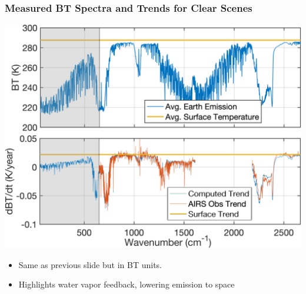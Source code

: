 \documentclass[10pt,t]{beamer}
\begin{document}
\begin{frame}
\frametitle{Measured BT Spectra and Trends for Clear Scenes}  
\vspace{-0.03in}
\centering \includegraphics[width=0.85\linewidth]{Figslls/bt_trends_all_cm.png}
\vspace{-0.05in}
\begin{small}
\begin{itemize}
\item Same as previous slide but in BT units.
\item Highlights water vapor feedback, lowering emission to space
\end{itemize}
\end{small}
\end{frame}
\end{document}

